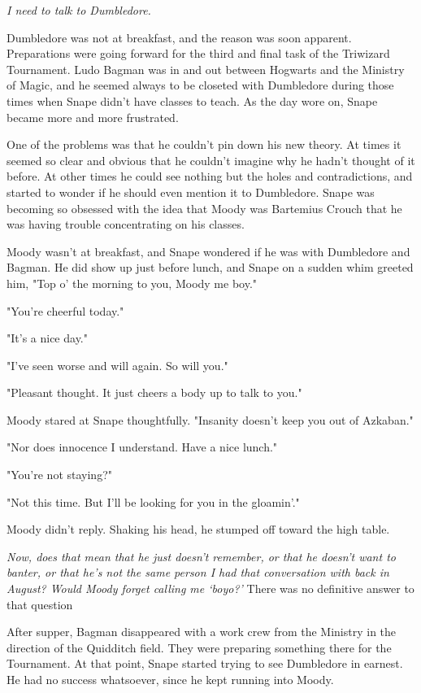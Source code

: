 \emph{I need to talk to Dumbledore.}

Dumbledore was not at breakfast, and the reason was soon apparent. Preparations were going forward for the third and final task of the Triwizard Tournament. Ludo Bagman was in and out between Hogwarts and the Ministry of Magic, and he seemed always to be closeted with Dumbledore during those times when Snape didn't have classes to teach. As the day wore on, Snape became more and more frustrated.

One of the problems was that he couldn't pin down his new theory. At times it seemed so clear and obvious that he couldn't imagine why he hadn't thought of it before. At other times he could see nothing but the holes and contradictions, and started to wonder if he should even mention it to Dumbledore. Snape was becoming so obsessed with the idea that Moody was Bartemius Crouch that he was having trouble concentrating on his classes.

Moody wasn't at breakfast, and Snape wondered if he was with Dumbledore and Bagman. He did show up just before lunch, and Snape on a sudden whim greeted him, "Top o' the morning to you, Moody me boy."

"You're cheerful today."

"It's a nice day."

"I've seen worse and will again. So will you."

"Pleasant thought. It just cheers a body up to talk to you."

Moody stared at Snape thoughtfully. "Insanity doesn't keep you out of Azkaban."

"Nor does innocence I understand. Have a nice lunch."

"You're not staying?"

"Not this time. But I'll be looking for you in the gloamin'."

Moody didn't reply. Shaking his head, he stumped off toward the high table.

\emph{Now, does that mean that he just doesn't remember, or that he doesn't want to banter, or that he's not the same person I had that conversation with back in August? Would Moody forget calling me `boyo?'} There was no definitive answer to that question

After supper, Bagman disappeared with a work crew from the Ministry in the direction of the Quidditch field. They were preparing something there for the Tournament. At that point, Snape started trying to see Dumbledore in earnest. He had no success whatsoever, since he kept running into Moody.

